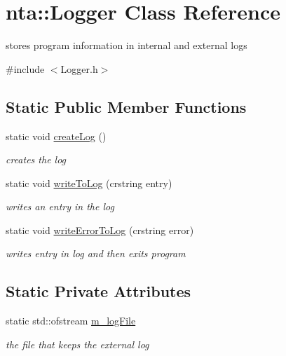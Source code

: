 \hypertarget{classnta_1_1Logger}{}\section{nta\+:\+:Logger Class Reference}
\label{classnta_1_1Logger}


stores program information in internal and external logs  




{\ttfamily \#include $<$Logger.\+h$>$}

\subsection*{Static Public Member Functions}
\begin{DoxyCompactItemize}
\item 
\mbox{\label{classnta_1_1Logger_a308a3ec22f996556b3d54737ace33543}} 
static void \hyperlink{classnta_1_1Logger_a308a3ec22f996556b3d54737ace33543}{create\+Log} ()
\begin{DoxyCompactList}\small\item\em creates the log \end{DoxyCompactList}\item 
\mbox{\label{classnta_1_1Logger_a71196417598ddd975959924c2ce53c13}} 
static void \hyperlink{classnta_1_1Logger_a71196417598ddd975959924c2ce53c13}{write\+To\+Log} (crstring entry)
\begin{DoxyCompactList}\small\item\em writes an entry in the log \end{DoxyCompactList}\item 
\mbox{\label{classnta_1_1Logger_a08299f1414203eba74b306ce6712192e}} 
static void \hyperlink{classnta_1_1Logger_a08299f1414203eba74b306ce6712192e}{write\+Error\+To\+Log} (crstring error)
\begin{DoxyCompactList}\small\item\em writes entry in log and then exits program \end{DoxyCompactList}\end{DoxyCompactItemize}
\subsection*{Static Private Attributes}
\begin{DoxyCompactItemize}
\item 
\mbox{\label{classnta_1_1Logger_aba94cb82e0a5f5dd72719c80de5c3571}} 
static std\+::ofstream \hyperlink{classnta_1_1Logger_aba94cb82e0a5f5dd72719c80de5c3571}{m\+\_\+log\+File}
\begin{DoxyCompactList}\small\item\em the file that keeps the external log \end{DoxyCompactList}\end{DoxyCompactItemize}


